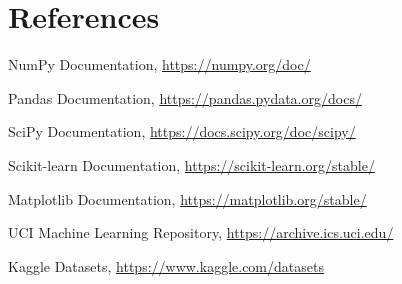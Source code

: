 \documentclass[12pt,a4paper]{article}
\begin{document}
\section{References}
\begin{enumerate}[label={[\arabic*]}]
\item NumPy Documentation, \url{https://numpy.org/doc/}
\item Pandas Documentation, \url{https://pandas.pydata.org/docs/}
\item SciPy Documentation, \url{https://docs.scipy.org/doc/scipy/}
\item Scikit-learn Documentation, \url{https://scikit-learn.org/stable/}
\item Matplotlib Documentation, \url{https://matplotlib.org/stable/}
\item UCI Machine Learning Repository, \url{https://archive.ics.uci.edu/}
\item Kaggle Datasets, \url{https://www.kaggle.com/datasets}
\end{enumerate}
\end{document}
